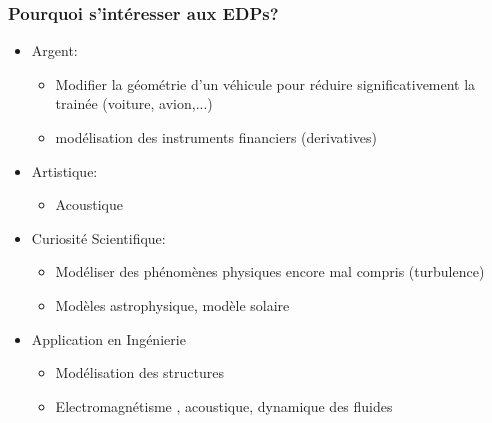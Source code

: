 \begin{frame}
  \frametitle{Pourquoi s'intéresser aux EDPs?}

  \begin{block}{}
    \begin{itemize}
    \item Argent:
      \begin{itemize}
      \item Modifier la géométrie d'un véhicule pour réduire significativement la trainée (voiture, avion,...)
      \item modélisation des instruments financiers (derivatives)
      \end{itemize}
    \item Artistique:
      \begin{itemize}
      \item Acoustique
      \end{itemize}
    \item Curiosité Scientifique:
      \begin{itemize}
      \item Modéliser des phénomènes physiques encore mal compris  (turbulence)
      \item Modèles astrophysique, modèle solaire
      \end{itemize}
    \item Application en Ingénierie
      \begin{itemize}
      \item Modélisation des structures
      \item Electromagnétisme , acoustique, dynamique des fluides
      \end{itemize}
  \end{itemize}

  \end{block}

\end{frame}

